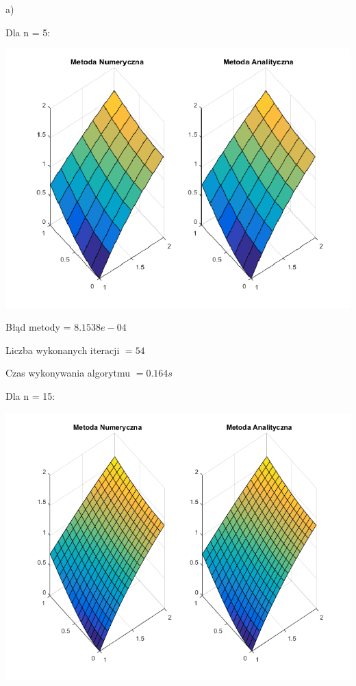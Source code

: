 a)

Dla n = 5:

{\centering
	
	\includegraphics{Lab6/charts/jacobi/1_5.png}
	
}

Błąd metody = $8.1538e-04$

Liczba wykonanych iteracji $ = 54 $

Czas wykonywania algorytmu $ = 0.164 s$

Dla n = 15:

{\centering
	
	\includegraphics{Lab6/charts/jacobi/1_15.png}
	
}

